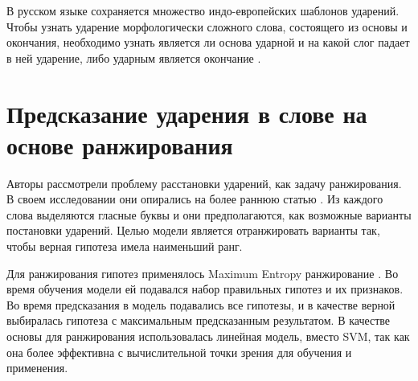 \documentclass[14pt, a4paper, russian]{extreport}
\begin{document}
В русском языке сохраняется множество индо-европейских шаблонов ударений. Чтобы узнать ударение морфологически сложного слова, состоящего из основы и окончания, необходимо узнать является ли основа ударной и на какой слог падает в ней ударение, либо ударным является окончание \cite{halle}.
\section{Предсказание ударения в слове на основе ранжирования}
Авторы \cite{hall} рассмотрели проблему расстановки ударений, как задачу ранжирования. В своем исследовании  они опирались на более раннюю статью \cite{dou}. Из каждого слова выделяются гласные буквы и они предполагаются, как возможные варианты постановки ударений. Целью модели является отранжировать варианты так, чтобы верная гипотеза имела наименьший ранг.

Для ранжирования гипотез применялось Maximum Entropy ранжирование \cite{collins}. Во время обучения модели ей подавался набор правильных гипотез и их признаков. Во время предсказания в модель подавались все гипотезы, и в качестве верной выбиралась гипотеза с максимальным предсказанным результатом. В качестве основы для ранжирования использовалась линейная модель, вместо SVM, так как она более эффективна с вычислительной точки зрения для обучения и применения. 
\end{document}
